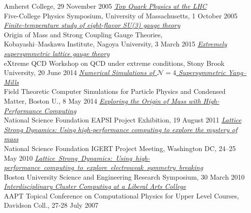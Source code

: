 \begin{spacelistout}
\begin{revnumerate}
      Amherst College, 29 November 2005
    \pagebreakitem
      \textit{\href{http://www.davidschaich.net/talks/topMass.pdf}{Top Quark Physics at the LHC}} \\
      Five-College Physics Symposium, University of Massachusetts, 1 October 2005 \\
%
%
%
\vspace{18 pt} \hspace{-22 pt}{\large \bfseries Posters} \vspace{-8 pt}
    \pagebreakitem
      \textit{\href{http://www.davidschaich.net/talks/SCGTposter.pdf}{Finite-temperature study of eight-flavor SU(3) gauge theory}} \\
      Origin of Mass and Strong Coupling Gauge Theories, \\ Kobayashi--Maskawa Institute, Nagoya University, 3 March 2015
    \pagebreakitem
      \textit{\href{http://www.davidschaich.net/talks/XQCD14.pdf}{Extremely supersymmetric lattice gauge theory}} \\
      eXtreme QCD Workshop on QCD under extreme conditions, Stony Brook University, 20 June 2014
    \pagebreakitem
      \textit{\href{http://www.davidschaich.net/talks/PPCM14.pdf}{Numerical Simulations of $\mathcal N = 4$ Supersymmetric Yang--Mills}} \\
      Field Theoretic Computer Simulations for Particle Physics and Condensed Matter, Boston U., 8 May 2014
    \pagebreakitem
      \textit{\href{http://www.davidschaich.net/talks/SITposter.pdf}{Exploring the Origin of Mass with High-Performance Computing}} \\
      National Science Foundation EAPSI Project Exhibition, 19 August 2011
    \pagebreakitem
      \textit{\href{http://www.davidschaich.net/talks/IGERT.pdf}{Lattice Strong Dynamics: Using high-performance computing to explore the mystery of mass}} \\
      National Science Foundation IGERT Project Meeting, Washington DC, 24--25 May 2010
    \pagebreakitem
      \textit{\href{http://www.davidschaich.net/talks/BUsymposium.pdf}{Lattice~Strong~Dynamics:~Using~high-performance~computing~to~explore~electroweak~symmetry~breaking}} \\
      Boston University Science and Engineering Research Symposium, 30 March 2010
    \pagebreakitem
      \textit{\href{http://www.davidschaich.net/talks/AAPT07.pdf}{Interdisciplinary Cluster Computing at a Liberal Arts College}} \\
      AAPT Topical Conference on Computational Physics for Upper Level Courses, Davidson Coll., 27-28 July 2007
  \end{revnumerate}
\end{spacelistout}
